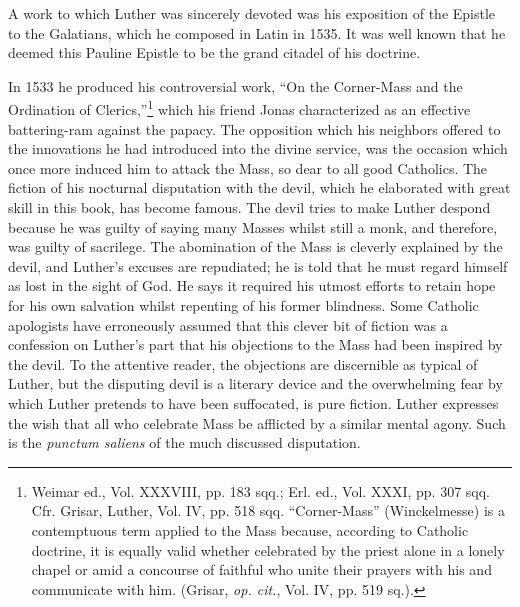A work to which Luther was sincerely devoted was his exposition of
the Epistle to the Galatians, which he composed in Latin in 1535. It
was well known that he deemed this Pauline Epistle to be the grand
citadel of his doctrine.

In 1533 he produced his controversial work, “On the Corner-Mass
and the Ordination of Clerics,”\footnote
{Weimar ed., Vol. XXXVIII, pp. 183 sqq.; Erl. ed., Vol. XXXI, pp. 307 sqq. Cfr. Grisar,
Luther, Vol. IV, pp. 518 sqq. “Corner-Mass” (Winckelmesse) is a contemptuous term applied
to the Mass because, according to Catholic doctrine, it is equally valid whether celebrated
by the priest alone in a lonely chapel or amid a concourse of faithful who unite their
prayers with his and communicate with him. (Grisar, \textit{op. cit.}, Vol. IV, pp. 519 sq.).}
which his friend Jonas characterized
as an effective battering-ram against the papacy. The opposition which
his neighbors offered to the innovations he had introduced into the
divine service, was the occasion which once more induced him to attack
the Mass, so dear to all good Catholics. The fiction of his nocturnal
disputation with the devil, which he elaborated with great
skill in this book, has become famous. The devil tries to make Luther
despond because he was guilty of saying many Masses whilst still
a monk, and therefore, was guilty of sacrilege. The abomination of the
Mass is cleverly explained by the devil, and Luther’s excuses are repudiated;
he is told that he must regard himself as lost in the sight
of God. He says it required his utmost efforts to retain hope for his
own salvation whilst repenting of his former blindness. Some Catholic
apologists have erroneously assumed that this clever bit of fiction was
a confession on Luther’s part that his objections to the Mass had been
inspired by the devil. To the attentive reader, the objections are discernible
as typical of Luther, but the disputing devil is a literary
device and the overwhelming fear by which Luther pretends to have
been suffocated, is pure fiction. Luther expresses the wish that all who
celebrate Mass be afflicted by a similar mental agony. Such is the
\textit{punctum saliens} of the much discussed disputation.

